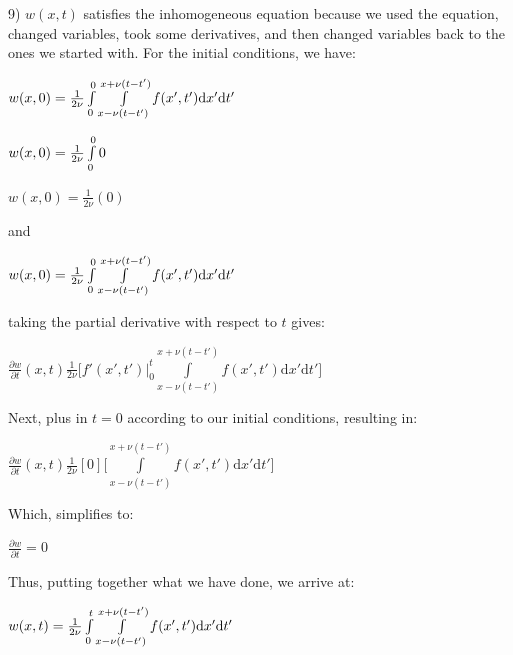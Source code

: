 \documentclass[executivepaper]{article}
\begin{document}
\begin{flushleft}

9) $w(x,t)$ satisfies the inhomogeneous equation because we used the equation, changed variables, took some derivatives, and then changed variables back to the ones we started with. For the initial conditions, we have:

\begin{center}

$w(x,0)=\frac{1}{2\nu} \int\limits_{\vphantom{b}0}^{0}\int\limits_{x-\nu(t-t')}^{x+\nu(t-t')} f(x',t') \mathrm{d}x' \mathrm{d}t'$

\vspace{3mm}

$w(x,0)=\frac{1}{2\nu} \int\limits_{\vphantom{b}0}^{0}0$

\vspace{3mm}

$w(x,0)=\frac{1}{2\nu}(0)$

\vspace{5mm}

and 

\vspace{5mm}

$w(x,0)=\frac{1}{2\nu} \int\limits_{\vphantom{b}0}^{0}\int\limits_{x-\nu(t-t')}^{x+\nu(t-t')} f(x',t') \mathrm{d}x' \mathrm{d}t'$

\vspace{3mm}

taking the partial derivative with respect to $t$ gives:

$\frac{\partial w}{\partial t} (x,t) \frac{1}{2\nu} \bigg[f'(x',t') \Big|_0^t \int\limits_{x-\nu(t-t')}^{x+\nu(t-t')} f(x',t') \mathrm{d}x' \mathrm{d}t' \bigg]$

\vspace{3mm}

Next, plus in $t=0$ according to our initial conditions, resulting in:

\vspace{3mm}

$\frac{\partial w}{\partial t} (x,t) \frac{1}{2\nu} [0] \bigg[\int\limits_{x-\nu(t-t')}^{x+\nu(t-t')} f(x',t') \mathrm{d}x' \mathrm{d}t' \bigg]$

\vspace{3mm}

Which, simplifies to:

\vspace{3mm}

$\frac{\partial w}{\partial t}=0$

\end{center}

\vspace{3mm}

Thus, putting together what we have done, we arrive at:

\begin{center}

$w(x,t)=\frac{1}{2\nu} \int\limits_{\vphantom{b}0}^{t}\int\limits_{x-\nu(t-t')}^{x+\nu(t-t')} f(x',t') \mathrm{d}x' \mathrm{d}t'$

\end{center}

\end{flushleft}
\end{document}
